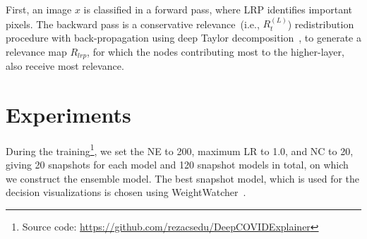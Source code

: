\documentclass[conference]{IEEEtran}
\begin{document}
First, an image $x$ is classified in a forward pass, where LRP identifies important pixels. The backward pass is a conservative relevance~(i.e., $R_{t}^{(L)}$) redistribution procedure with back-propagation using deep Taylor decomposition~\cite{DTD}, to generate a relevance map $R_{lrp}$, for which the nodes contributing most to the higher-layer, also receive most relevance. 
\fi 

\section{Experiments}
\label{sec:er}
During the training\footnote{Source code: \url{https://github.com/rezacsedu/DeepCOVIDExplainer}}, we set the NE to 200, maximum LR to 1.0, and NC to 20, giving 20 snapshots for each model and 120 snapshot models in total, on which we construct the ensemble model. The best snapshot model, which is used for the decision visualizations is chosen using WeightWatcher~\cite{martin2019traditional}. 
\end{document}
